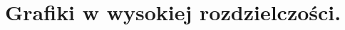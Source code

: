 \documentclass{article}
\begin{document}









\pagebreak









\clearpage
\section{Grafiki w wysokiej rozdzielczości.}
\end{document}
